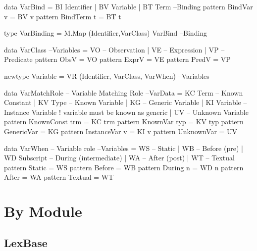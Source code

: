 \begin{code}
data VarBind = BI Identifier | BV Variable | BT Term                 --Binding
pattern BindVar  v  =  BV v
pattern BindTerm t  =  BT t
\end{code}

\begin{code}
type VarBinding = M.Map (Identifier,VarClass) VarBind                --Binding
\end{code}

\begin{code}
data VarClass                                                     --Variables
  = VO -- Observation
  | VE -- Expression
  | VP -- Predicate
pattern ObsV  = VO
pattern ExprV = VE
pattern PredV = VP
\end{code}

\begin{code}
newtype Variable  = VR (Identifier, VarClass, VarWhen)            --Variables
\end{code}

\begin{code}
data VarMatchRole -- Variable Matching Role                          --VarData
  =  KC Term     -- Known Constant
  |  KV Type     -- Known Variable
  |  KG          -- Generic Variable
  |  KI Variable -- Instance Variable ! variable must be known as generic
  |  UV          -- Unknown Variable
pattern KnownConst trm = KC trm
pattern KnownVar typ   = KV typ
pattern GenericVar     = KG
pattern InstanceVar v  = KI v
pattern UnknownVar     = UV
\end{code}


\begin{code}
data VarWhen -- Variable role                                      --Variables
  = WS            --  Static
  | WB            --  Before (pre)
  | WD Subscript  --  During (intermediate)
  | WA            --  After (post)
  | WT            --  Textual
pattern Static    =  WS
pattern Before    =  WB
pattern During n  =  WD n
pattern After     =  WA
pattern Textual   =  WT
\end{code}


\section{By Module}

\subsection{LexBase}

